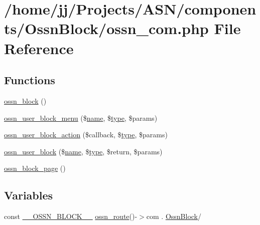 \hypertarget{_ossn_block_2ossn__com_8php}{}\section{/home/jj/\+Projects/\+A\+S\+N/components/\+Ossn\+Block/ossn\+\_\+com.php File Reference}
\label{_ossn_block_2ossn__com_8php}
\subsection*{Functions}
\begin{DoxyCompactItemize}
\item 
\hyperlink{_ossn_block_2ossn__com_8php_a2cee930ba0509f07d745792d84356712}{ossn\+\_\+block} ()
\item 
\hyperlink{_ossn_block_2ossn__com_8php_a11c250518503c619b97f315709229e56}{ossn\+\_\+user\+\_\+block\+\_\+menu} (\$\hyperlink{user_8php_a765af5e9671743530143a6d3670fd9a6}{name}, \$\hyperlink{_ossn_wall_2actions_2wall_2post_2group_8php_a2dc1bb4e1ed0029daa81ac0776b14b51}{type}, \$params)
\item 
\hyperlink{_ossn_block_2ossn__com_8php_ad4e239cd9ef414d690323f2a0e598340}{ossn\+\_\+user\+\_\+block\+\_\+action} (\$callback, \$\hyperlink{_ossn_wall_2actions_2wall_2post_2group_8php_a2dc1bb4e1ed0029daa81ac0776b14b51}{type}, \$params)
\item 
\hyperlink{_ossn_block_2ossn__com_8php_a8695b1e12a346cbe0bf70378ae4ee0fe}{ossn\+\_\+user\+\_\+block} (\$\hyperlink{user_8php_a765af5e9671743530143a6d3670fd9a6}{name}, \$\hyperlink{_ossn_wall_2actions_2wall_2post_2group_8php_a2dc1bb4e1ed0029daa81ac0776b14b51}{type}, \$return, \$params)
\item 
\hyperlink{_ossn_block_2ossn__com_8php_ae6c7f2236cc0300681ec6e2c5fff01a0}{ossn\+\_\+block\+\_\+page} ()
\end{DoxyCompactItemize}
\subsection*{Variables}
\begin{DoxyCompactItemize}
\item 
const \hyperlink{_ossn_block_2ossn__com_8php_a4eba010f92fd4a652709ad38968ff786}{\+\_\+\+\_\+\+O\+S\+S\+N\+\_\+\+B\+L\+O\+C\+K\+\_\+\+\_\+} \hyperlink{ossn_8lib_8route_8php_ac23dc424aa33dcd57982b72f4ed1217e}{ossn\+\_\+route}()-\/$>$com . \textquotesingle{}\hyperlink{class_ossn_block}{Ossn\+Block}/\textquotesingle{}
\end{DoxyCompactItemize}


